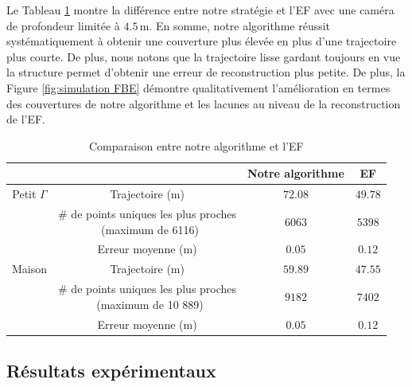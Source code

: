 Le Tableau \ref{tbl: simulation results 3} montre la différence entre notre stratégie et l'EF avec une caméra de profondeur limitée à $4.5\, \mathrm{m}$. En somme, notre algorithme réussit systématiquement à obtenir une couverture plus élevée en plus d'une trajectoire plus courte. De plus, nous notons que la trajectoire lisse gardant toujours en vue la structure permet d'obtenir une erreur de reconstruction plus petite. De plus, la Figure \ref{fig:simulation FBE} démontre qualitativement l'amélioration en termes des couvertures de notre algorithme et les lacunes au niveau de la reconstruction de l'EF.

\begin{table}[!ht]
\renewcommand{\arraystretch}{1.3}
\caption{Comparaison entre notre algorithme et l'EF}
\label{tbl: simulation results 3}
\centering
\begin{tabular}{|c|c|c|c|}
\cline{3-4}
\multicolumn{2}{c|}{} & Notre algorithme & EF \\
\hline
{Petit $\Gamma$} & Trajectoire (m)            & $72.08$  & $49.78$  \\\cline{2-4}
								& \specialcell{\# de points uniques les plus proches \\ (maximum de 6116)} & $6063$          & $5398$          \\\cline{2-4}
                & Erreur moyenne (m)             & $0.05$ & $0.12$\\\cline{2-4}
\hline
{Maison} & Trajectoire (m) & $59.89$ & $47.55$ \\\cline{2-4}
					   & \specialcell{\# de points uniques les plus proches \\ (maximum de 10 889)} & $9182$ & $7402$ \\\cline{2-4}
					   &  Erreur moyenne (m)             & $0.05$ & $0.12$\\\cline{2-4}
\hline
\end{tabular}
\end{table}


\subsection{Résultats expérimentaux}

